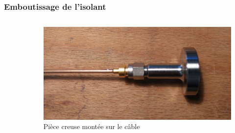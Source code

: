 \documentclass[8pt,a9paper]{beamer} \usepackage[utf8]{inputenc} \usepackage[francais]{babel} \usepackage[T1]{fontenc}
\begin{document}
\begin{frame}
\frametitle{Emboutissage de l'isolant}
\begin{columns}
\begin{column}{0.5\textwidth}
    \begin{description}
        \item[]~\\
    \end{description}
\end{column}
\begin{column}{0.5\textwidth}
\begin{figure}[h]
    \begin{center}
        \includegraphics[width=\textwidth]{Images/Coax/6}
        \caption{Pièce creuse montée sur le câble}
    \end{center}
\end{figure}
\end{column}
\end{columns}
\end{frame}
\end{document}
